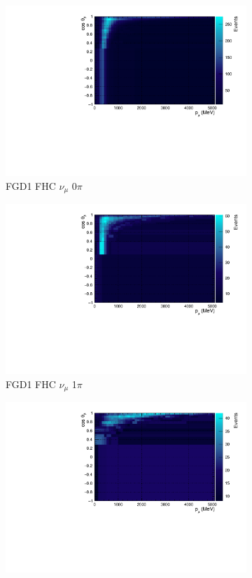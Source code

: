 \begin{figure}
\centering
\begin{subfigure}{.32\textwidth}
  \centering
  \includegraphics[width=0.95\linewidth]{figs/TH2PolyNom_MC_FGD1_numuCC_0pi}
  \caption{FGD1 FHC $\nu_{\mu}$ 0$\pi$}
  \label{fig:th2polynomFGD1_numuCC_0pi}
\end{subfigure}
\begin{subfigure}{.32\textwidth}
  \centering
  \includegraphics[width=0.95\linewidth]{figs/TH2PolyNom_MC_FGD1_numuCC_1pi}
  \caption{FGD1 FHC $\nu_{\mu}$ 1$\pi$}
  \label{fig:th2polynomFGD1_numuCC_1pi}
\end{subfigure}
\begin{subfigure}{.32\textwidth}
  \centering
  \includegraphics[width=0.95\linewidth]{figs/TH2PolyNom_MC_FGD1_numuCC_other}

\end{subfigure}
\end{figure}
